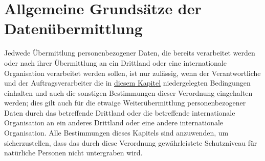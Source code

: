 \chapter{Allgemeine Grundsätze der Datenübermittlung}
\label{ch:44}


Jedwede Übermittlung personenbezogener Daten, die bereits verarbeitet werden oder nach ihrer Übermittlung an ein
Drittland oder eine internationale Organisation verarbeitet werden sollen, ist nur zulässig, wenn der Verantwortliche
und der Auftragsverarbeiter die in \hyperref[part:5]{diesem Kapitel} niedergelegten Bedingungen einhalten und auch die
sonstigen Bestimmungen dieser Verordnung eingehalten werden; dies gilt auch für die etwaige Weiterübermittlung
personenbezogener Daten durch das betreffende Drittland oder die betreffende internationale Organisation an ein anderes
Drittland oder eine andere internationale Organisation. Alle Bestimmungen dieses Kapitels sind anzuwenden, um
sicherzustellen, dass das durch diese Verordnung gewährleistete Schutzniveau für natürliche Personen nicht untergraben
wird.



